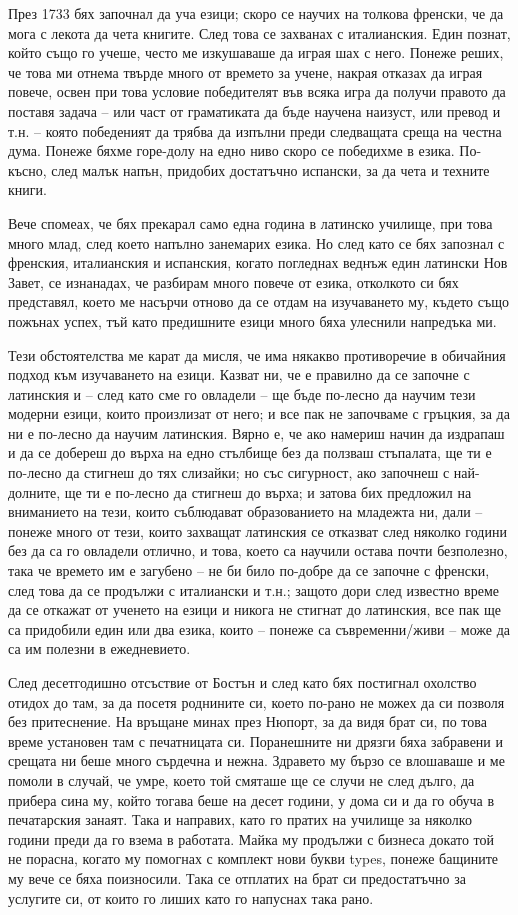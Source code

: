 \documentclass[12pt]{book}
\begin{document}
През 1733 бях започнал да уча езици; скоро се научих на толкова френски, че да мога с лекота да чета книгите. След това се захванах с италианския. Един познат, който също го учеше, често ме изкушаваше да играя шах с него. Понеже реших, че това ми отнема твърде много от времето за учене, накрая отказах да играя повече, освен при това условие победителят във всяка игра да получи правото да поставя задача – или част от граматиката да бъде научена наизуст, или превод и т.н. – която победеният да трябва да изпълни преди следващата среща на честна дума. Понеже бяхме горе-долу на едно ниво скоро се победихме в езика. По-късно, след малък напън, придобих достатъчно испански, за да чета и техните книги.

Вече спомеах, че бях прекарал само една година в латинско училище, при това много млад, след което напълно занемарих езика. Но след като се бях запознал с френския, италианския и испанския, когато погледнах веднъж един латински Нов Завет, се изнанадах, че разбирам много повече от езика, отколкото си бях представял, което ме насърчи отново да се отдам на изучаването му, където също пожънах успех, тъй като предишните езици много бяха улеснили напредъка ми. 

Тези обстоятелства ме карат да мисля, че има някакво противоречие в обичайния подход към изучаването на езици. Казват ни, че е правилно да се започне с латинския и – след като сме го овладели – ще бъде по-лесно да научим тези модерни езици, които произлизат от него; и все пак не започваме с гръцкия, за да ни е по-лесно да научим латинския. Вярно е, че ако намериш начин да издрапаш и да се добереш до върха на едно стълбище без да ползваш стъпалата, ще ти е по-лесно да стигнеш до тях слизайки; но със сигурност, ако започнеш с най-долните, ще ти е по-лесно да стигнеш до върха; и затова бих предложил на вниманието на тези, които съблюдават образованието на младежта ни, дали – понеже много от тези, които захващат латинския се отказват след няколко години без да са го овладели отлично, и това, което са научили остава почти безполезно, така че времето им е загубено – не би било по-добре да се започне с френски, след това да се продължи с италиански и т.н.; защото дори след известно време да се откажат от ученето на езици и никога не стигнат до латинския, все пак ще са придобили един или два езика, които – понеже са съвременни/живи – може да са им полезни в ежедневието.

След десетгодишно отсъствие от Бостън и след като бях постигнал охолство отидох до там, за да посетя роднините си, което по-рано не можех да си позволя без притеснение. На връщане минах през Нюпорт, за да видя брат си, по това време установен там с печатницата си. Поранешните ни дрязги бяха забравени и срещата ни беше много сърдечна и нежна. Здравето му бързо се влошаваше и ме помоли в случай, че умре, което той смяташе ще се случи не след дълго, да прибера сина му, който тогава беше на десет години,  у дома си и да го обуча в печатарския занаят. Така и направих, като го пратих на училище за няколко години преди да го взема в работата. Майка му продължи с бизнеса докато той не порасна, когато му помогнах с комплект нови букви types, понеже бащините му вече се бяха поизносили. Така се отплатих на брат си предостатъчно за услугите си, от които го лиших като го напуснах така рано.
\end{document}
